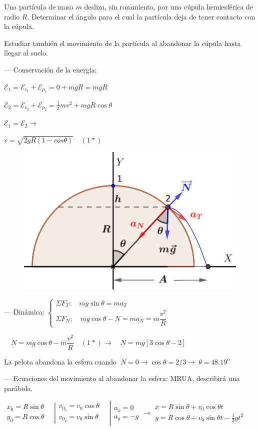 \begin{prob}
	Una partícula de masa $m$ desliza, sin rozamiento, por una cúpula hemiesférica de radio $R$. Determinar el ángulo para el cual la partícula deja de tener contacto con la cúpula.
	
	Estudiar también el movimiento de la partícula al abandonar la cúpula hasta llegar al suelo. 
\end{prob}
\begin{multicols}{2}
--- Conservación de la energía:

$\mathcal E_1 =\mathcal E_{c_1}+\mathcal E_{p_1}=0+mgR=mgR$

$\mathcal E_2=\mathcal E_{c_2}+\mathcal E_{p_2}=\frac 1 2 m v^2+mgR\cos \theta$

$\mathcal E_1=\mathcal E_2 \to $

$v=\sqrt{2gR(1-cos \theta)}\quad (1*)$

\begin{figure}[H]
	\centering
	\includegraphics[width=.5\textwidth]{imagenes/imagenes04/T04IM22.png}
\end{figure}
\end{multicols}

--- Dinámica: $\begin{cases} \Sigma F_T: \quad mg\sin \theta=ma_T \\ \Sigma F_N:\quad mg\cos \theta-N=ma_N=m\dfrac {v^2}R \end{cases}$

$ \quad  N=mg\cos \theta-m\dfrac {v^2}R \quad (1*) \to \quad N=mg[3\cos \theta - 2]$

La pelota abandona la esfera cuando $\ N=0\to \cos \theta =2/3 \to \ \theta =48.19^o$

--- Ecuaciones del movimiento al abandonar la esfera: MRUA, describirá una parábola.

$\left. \begin{matrix}
x_0=R\sin \theta \quad \\ y_0=R \cos \theta \quad 	
 \end{matrix} \right|
 \left. \begin{matrix}
 v_{0_x}=v_0 \cos \theta \quad \\ v_{0_y}=v_0 \sin \theta \quad 	
 \end{matrix} \right|
 \left. \begin{matrix}
 a_x=0 \ \ \\ a_y=-g	
 \end{matrix} \right.
 \to 
 \left. \begin{matrix}
 	x=R \sin \theta + v_0 \cos \theta t \quad \quad \quad \\
 	y=R \cos \theta +  v_0 \sin \theta t - \frac 1 2 g t^2 \ 
 \end{matrix} \right.$

